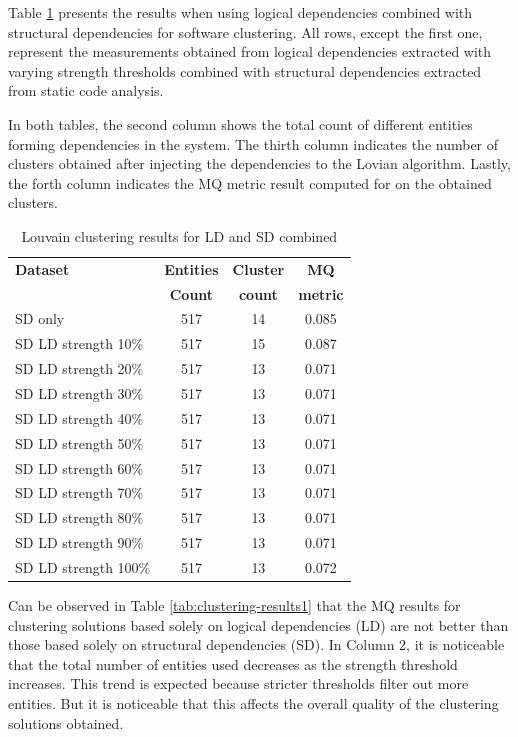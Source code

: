 \documentclass[conference]{IEEEtran}
\begin{document}
Table \ref{tab:clustering-results2} presents the results when using logical dependencies combined with structural dependencies for software clustering. All rows, except the first one, represent the measurements obtained from logical dependencies extracted with varying strength thresholds combined with structural dependencies extracted from static code analysis.

In both tables, the second column shows the total count of different entities forming dependencies in the system. The thirth column indicates the number of clusters obtained after injecting the dependencies to the Lovian algorithm. Lastly, the forth column indicates the MQ metric result computed for on the obtained clusters.

\begin{table}[htbp]
  \centering
  \caption{Louvain clustering results for LD and SD combined}
  \label{tab:clustering-results2}
  \begin{tabular}{lc|c|c}
    \toprule
    \textbf{Dataset} & \textbf{Entities} & \textbf{Cluster} & \textbf{MQ } \\
    & \textbf{Count} & \textbf{count} &  \textbf{metric} \\
    \midrule
    SD only & 517 & 14 &  0.085  \\
    \midrule
SD  LD  strength    10\%    &   517 &   15  &   0.087   \\
SD  LD  strength    20\%    &   517 &   13  &   0.071   \\
SD  LD  strength    30\%    &   517 &   13  &   0.071   \\
SD  LD  strength    40\%    &   517 &   13  &   0.071   \\
SD  LD  strength    50\%    &   517 &   13  &   0.071   \\
SD  LD  strength    60\%    &   517 &   13  &   0.071   \\
SD  LD  strength    70\%    &   517 &   13  &   0.071   \\
SD  LD  strength    80\%    &   517 &   13  &   0.071   \\
SD  LD  strength    90\%    &   517 &   13  &   0.071   \\
SD  LD  strength    100\%   &   517 &   13  &   0.072   \\

    \bottomrule
  \end{tabular}
\end{table}

Can be observed in Table \ref{tab:clustering-results1} that the MQ results for clustering solutions based solely on logical dependencies (LD) are not better than those based solely on structural dependencies (SD). In Column 2, it is noticeable that the total number of entities used decreases as the strength threshold increases. This trend is expected because stricter thresholds filter out more entities. But it is noticeable that this affects the overall quality of the clustering solutions obtained.
\end{document}
